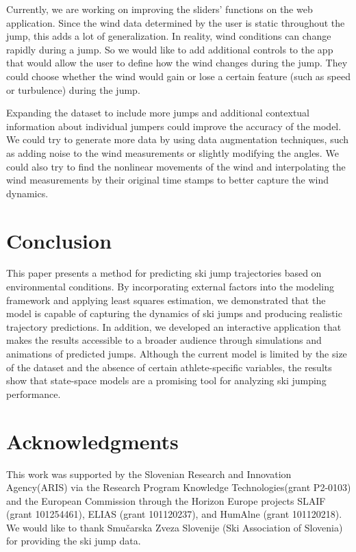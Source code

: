 \documentclass[sigconf,natbib=false, language=english]{acmart}
\begin{document}
Currently, we are working on improving the sliders’ functions on the web application. Since the wind
data determined by the user is static throughout the jump, this adds a lot of
generalization. In reality, wind conditions can change rapidly during a jump.
So we would like to add additional controls to the app that would allow the
user to define how the wind changes during the jump. They could choose whether
the wind would gain or lose a certain feature (such as speed or turbulence)
during the jump.

Expanding the dataset to include more jumps and additional contextual
information about individual jumpers could improve the accuracy of the model.
We could try to generate more data by using data augmentation techniques, such
as adding noise to the wind measurements or slightly modifying the angles. We
could also try to find the nonlinear movements of the wind and interpolating
the wind measurements by their original time stamps to better capture the wind
dynamics.


\section{Conclusion}\label{sec:conclusion}

This paper presents a method for predicting ski jump trajectories based on environmental conditions. By incorporating external factors into the modeling framework and applying least squares estimation, we demonstrated that the model is capable of capturing the dynamics of ski jumps and producing realistic trajectory predictions. In addition, we developed an interactive application that makes the results accessible to a broader audience through simulations and animations of predicted jumps. Although the current model is limited by the size of the dataset and the absence of certain athlete-specific variables, the results show that state-space models are a promising tool for analyzing ski jumping performance.

\section{Acknowledgments}
This work was supported by the Slovenian Research and Innovation Agency(ARIS) via the Research Program Knowledge Technologies(grant P2-0103) and the European Commission through the Horizon Europe projects SLAIF (grant 101254461), ELIAS (grant 101120237), and HumAlne (grant 101120218). We would like to thank Smučarska Zveza Slovenije (Ski Association of Slovenia) for providing the ski jump data.
% 

\appendix



\printbibliography
\end{document}
